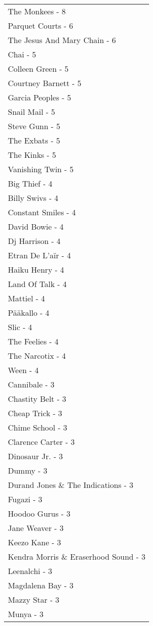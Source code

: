 \documentclass[
]{article}
\begin{document}
\begin{longtable}{l}
\midrule
The Monkees - 8 \\ 
Parquet Courts - 6 \\ 
The Jesus And Mary Chain - 6 \\ 
Chai - 5 \\ 
Colleen Green - 5 \\ 
Courtney Barnett - 5 \\ 
Garcia Peoples - 5 \\ 
Snail Mail - 5 \\ 
Steve Gunn - 5 \\ 
The Exbats - 5 \\ 
The Kinks - 5 \\ 
Vanishing Twin - 5 \\ 
Big Thief - 4 \\ 
Billy Swivs - 4 \\ 
Constant Smiles - 4 \\ 
David Bowie - 4 \\ 
Dj Harrison - 4 \\ 
Etran De L’aïr - 4 \\ 
Haiku Henry - 4 \\ 
Land Of Talk - 4 \\ 
Mattiel - 4 \\ 
Pääkallo - 4 \\ 
Slic - 4 \\ 
The Feelies - 4 \\ 
The Narcotix - 4 \\ 
Ween - 4 \\ 
Cannibale - 3 \\ 
Chastity Belt - 3 \\ 
Cheap Trick - 3 \\ 
Chime School - 3 \\ 
Clarence Carter - 3 \\ 
Dinosaur Jr. - 3 \\ 
Dummy - 3 \\ 
Durand Jones \& The Indications - 3 \\ 
Fugazi - 3 \\ 
Hoodoo Gurus - 3 \\ 
Jane Weaver - 3 \\ 
Keezo Kane - 3 \\ 
Kendra Morris \& Eraserhood Sound - 3 \\ 
Leenalchi - 3 \\ 
Magdalena Bay - 3 \\ 
Mazzy Star - 3 \\ 
Munya - 3 \\ 

\end{longtable}
\end{document}
